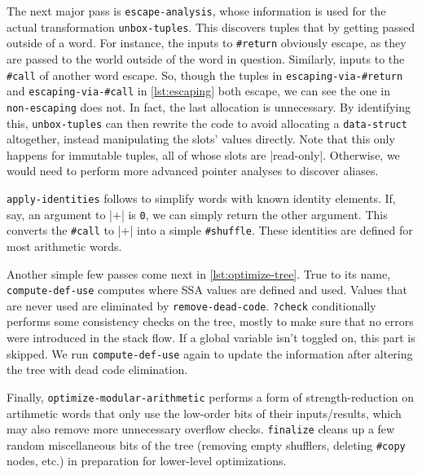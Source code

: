 
The next major pass is \Verb|escape-analysis|, whose information is used for
the actual transformation \Verb|unbox-tuples|.  This discovers tuples that
 by getting passed outside of a word.  For instance, the inputs to
\Verb|#return| obviously escape, as they are passed to the world outside of
the word in question.  Similarly, inputs to the \Verb|#call| of another word
escape.  So, though the tuples in \Verb|escaping-via-#return| and
\Verb|escaping-via-#call| in \cref{lst:escaping} both escape, we can see the
one in \Verb|non-escaping| does not.  In fact, the last allocation is
unnecessary.  By identifying this, \Verb|unbox-tuples| can then rewrite the
code to avoid allocating a \Verb|data-struct| altogether, instead
manipulating the slots' values directly.  Note that this only happens for
immutable tuples, all of whose slots are \factor|read-only|.  Otherwise, we
would need to perform more advanced pointer analyses to discover aliases.

\Verb|apply-identities| follows to simplify words with known identity
elements.  If, say, an argument to \factor|+| is \Verb|0|, we can simply
return the other argument.  This converts the \Verb|#call| to \factor|+| into
a simple \Verb|#shuffle|.  These identities are defined for most arithmetic
words.

Another simple few passes come next in \cref{lst:optimize-tree}.  True to its
name, \Verb|compute-def-use| computes where \gls{SSA} values are defined and
used.  Values that are never used are eliminated by \Verb|remove-dead-code|.
\Verb|?check| conditionally performs some consistency checks on the tree,
mostly to make sure that no errors were introduced in the stack flow.  If a
global variable isn't toggled on, this part is skipped.  We run
\Verb|compute-def-use| again to update the information after altering the
tree with dead code elimination.

Finally, \Verb|optimize-modular-arithmetic| performs a form of
strength-reduction on artihmetic words that only use the low-order bits of
their inputs/results, which may also remove more unnecessary overflow checks.
\Verb|finalize| cleans up a few random miscellaneous bits of the tree
(removing empty shufflers, deleting \Verb|#copy| nodes, etc.) in preparation
for lower-level optimizations.

